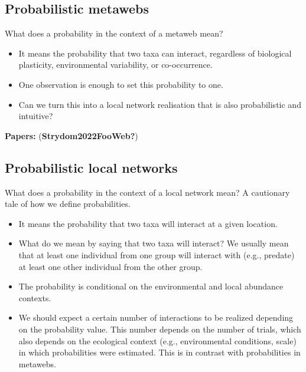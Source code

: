 \documentclass[11pt]{article}
\begin{document}
\hypertarget{probabilistic-metawebs}{%
\subsection{Probabilistic metawebs}\label{probabilistic-metawebs}}

What does a probability in the context of a metaweb mean?

\begin{itemize}
\tightlist
\item
  It means the probability that two taxa can interact, regardless of
  biological plasticity, environmental variability, or co-occurrence.
\item
  One observation is enough to set this probability to one.
\item
  Can we turn this into a local network realisation that is also
  probabilistic and intuitive?
\end{itemize}

\textbf{Papers:} (\textbf{Strydom2022FooWeb?})

\hypertarget{probabilistic-local-networks}{%
\subsection{Probabilistic local
networks}\label{probabilistic-local-networks}}

What does a probability in the context of a local network mean? A
cautionary tale of how we define probabilities.

\begin{itemize}
\tightlist
\item
  It means the probability that two taxa will interact at a given
  location.
\item
  What do we mean by saying that two taxa will interact? We usually mean
  that at least one individual from one group will interact with (e.g.,
  predate) at least one other individual from the other group.
\item
  The probability is conditional on the environmental and local
  abundance contexts.
\item
  We should expect a certain number of interactions to be realized
  depending on the probability value. This number depends on the number
  of trials, which also depends on the ecological context (e.g.,
  environmental conditions, scale) in which probabilities were
  estimated. This is in contrast with probabilities in metawebs.
\end{itemize}
\end{document}
